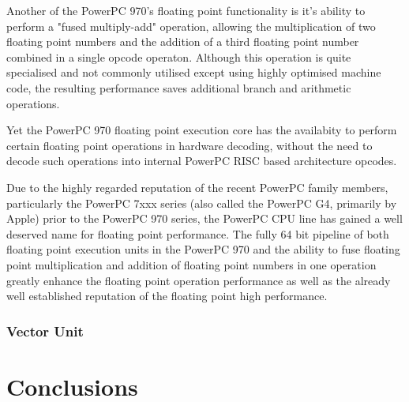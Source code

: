 \documentclass[a4paper,12pt]{article}
\begin{document}
Another \cite[well renoweded feature]{a5} of the PowerPC 970's floating
point functionality is it's ability to perform a "fused multiply-add"
operation, allowing the multiplication of two floating point numbers and
the addition of a third floating point number combined in a single
opcode operaton. Although this operation is quite specialised and not
commonly utilised except using highly optimised machine code, the resulting
performance saves additional branch and arithmetic operations. 


Yet \cite[another key feature]{a2} the PowerPC 970 floating point execution core 
has the availabity to perform certain floating point operations in
hardware decoding, without the need to decode such operations into
internal PowerPC RISC based architecture opcodes.


Due to the highly regarded reputation of the recent PowerPC family
members, particularly the PowerPC 7xxx series (also called the PowerPC
G4, primarily by Apple) prior to the PowerPC 970 series, the PowerPC 
CPU line has gained a well deserved name 
for floating point performance. The fully 64 bit pipeline of both 
floating point execution units in the PowerPC 970 and the ability to fuse 
floating point multiplication and addition of floating point numbers in 
one operation greatly enhance the floating point operation performance as 
well as the already well established reputation of the floating point high 
performance. 

\subsubsection{Vector Unit}



\section{Conclusions}




\end{document}
